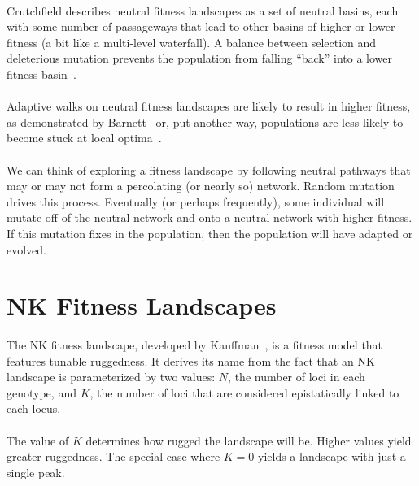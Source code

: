 \documentclass[12pt,letterpaper,titlepage]{article}
\begin{document}
\paragraph{}
Crutchfield describes neutral fitness landscapes as a set of neutral basins,
each with some number of passageways that lead to other basins of higher or
lower fitness (a bit like a multi-level waterfall). A balance between selection
and deleterious mutation prevents the population from falling ``back'' into a
lower fitness basin~\cite{Crutchfield1999}.

\paragraph{}
Adaptive walks on neutral fitness landscapes are likely to result in higher
fitness, as demonstrated by Barnett~\cite{Barnett1998} or, put another way,
populations are less likely to become stuck at local optima~\cite{Newman1998}.

\paragraph{}
We can think of exploring a fitness landscape by following neutral pathways
that may or may not form a percolating (or nearly so) network. Random mutation
drives this process. Eventually (or perhaps frequently), some individual will
mutate off of the neutral network and onto a neutral network with higher
fitness. If this mutation fixes in the population, then the population will
have adapted or evolved.

\section{NK Fitness Landscapes}

\paragraph{}
The NK fitness landscape, developed by Kauffman~\cite{Kauffman1993}, is a
fitness model that features tunable ruggedness. It derives its name from the
fact that an NK landscape is parameterized by two values: $N$, the number of
loci in each genotype, and $K$, the number of loci that are considered
epistatically linked to each locus.

\paragraph{}
The value of $K$ determines how rugged the landscape will be. Higher values
yield greater ruggedness. The special case where $K=0$ yields a landscape with
just a single peak.
\end{document}
